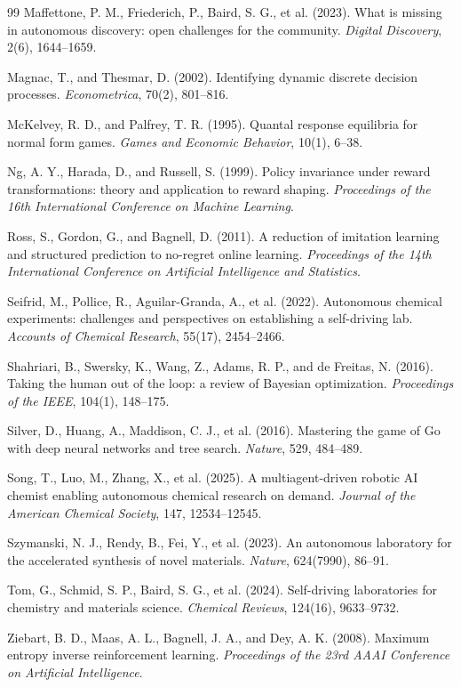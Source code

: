 \documentclass[11pt]{article}
\theoremstyle{definition}
\begin{document}
\begin{thebibliography}{99}
Maffettone, P. M., Friederich, P., Baird, S. G., et al. (2023). What is missing in autonomous discovery: open challenges for the community. \emph{Digital Discovery}, 2(6), 1644--1659.

Magnac, T., and Thesmar, D. (2002). Identifying dynamic discrete decision processes. \emph{Econometrica}, 70(2), 801--816.

McKelvey, R. D., and Palfrey, T. R. (1995). Quantal response equilibria for normal form games. \emph{Games and Economic Behavior}, 10(1), 6--38.

Ng, A. Y., Harada, D., and Russell, S. (1999). Policy invariance under reward transformations: theory and application to reward shaping. \emph{Proceedings of the 16th International Conference on Machine Learning}.

Ross, S., Gordon, G., and Bagnell, D. (2011). A reduction of imitation learning and structured prediction to no-regret online learning. \emph{Proceedings of the 14th International Conference on Artificial Intelligence and Statistics}.

Seifrid, M., Pollice, R., Aguilar-Granda, A., et al. (2022). Autonomous chemical experiments: challenges and perspectives on establishing a self-driving lab. \emph{Accounts of Chemical Research}, 55(17), 2454--2466.

Shahriari, B., Swersky, K., Wang, Z., Adams, R. P., and de Freitas, N. (2016). Taking the human out of the loop: a review of Bayesian optimization. \emph{Proceedings of the IEEE}, 104(1), 148--175.

Silver, D., Huang, A., Maddison, C. J., et al. (2016). Mastering the game of Go with deep neural networks and tree search. \emph{Nature}, 529, 484--489.

Song, T., Luo, M., Zhang, X., et al. (2025). A multiagent-driven robotic AI chemist enabling autonomous chemical research on demand. \emph{Journal of the American Chemical Society}, 147, 12534--12545.

Szymanski, N. J., Rendy, B., Fei, Y., et al. (2023). An autonomous laboratory for the accelerated synthesis of novel materials. \emph{Nature}, 624(7990), 86--91.

Tom, G., Schmid, S. P., Baird, S. G., et al. (2024). Self-driving laboratories for chemistry and materials science. \emph{Chemical Reviews}, 124(16), 9633--9732.

Ziebart, B. D., Maas, A. L., Bagnell, J. A., and Dey, A. K. (2008). Maximum entropy inverse reinforcement learning. \emph{Proceedings of the 23rd AAAI Conference on Artificial Intelligence}.

\end{thebibliography}
\end{document}
